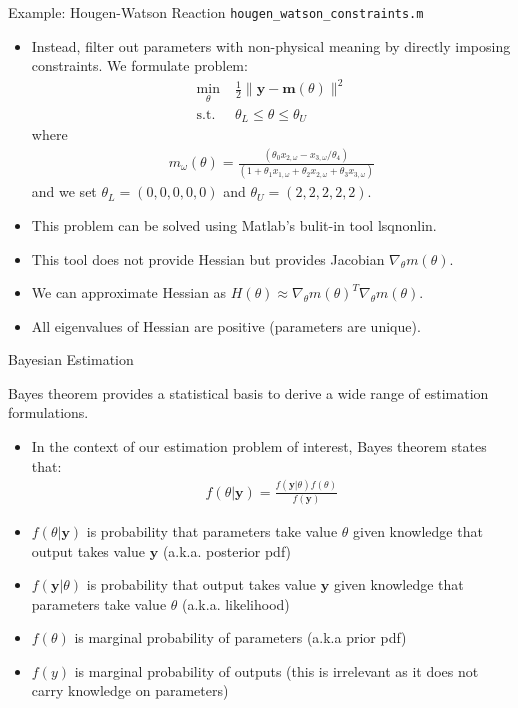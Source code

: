 \documentclass[handout,9pt]{beamer}
\begin{document}
%
\begin{frame}{Example: Hougen-Watson Reaction \footnotesize{\texttt{hougen\_watson\_constraints.m}}}

\begin{itemize}
\setlength{\itemsep}{10pt}
\item Instead, filter out parameters with non-physical meaning by directly imposing constraints. We formulate problem:
\begin{align*}
\min_{\theta}& \; \frac{1}{2}\|\mathbf{y}- \mathbf{m}(\theta)\|^2\\ 
\textrm{s.t.}&\; \theta_L\leq \theta\leq\theta_U 
\end{align*}
where
\begin{align*}
m_\omega(\theta)=\frac{(\theta_0x_{2,\omega}-x_{3,\omega}/\theta_4)}{(1+\theta_1x_{1,\omega}+\theta_2x_{2,\omega}+\theta_3x_{3,\omega})}
\end{align*}
and we set $\theta_L=(0,0,0,0,0)$ and $\theta_U=(2,2,2,2,2)$. 
\item This problem can be solved using Matlab's bulit-in tool \textrm{lsqnonlin}. 
\item This tool does not provide Hessian but provides Jacobian $\nabla_\theta m(\theta)$. 
\item We can approximate Hessian as $H(\theta)\approx \nabla_\theta m(\theta)^T\nabla_\theta m(\theta)$.
\item All eigenvalues of Hessian are positive (parameters are unique).
\end{itemize}
\end{frame}

%
\begin{frame}{Bayesian Estimation}

Bayes theorem provides a statistical basis to derive a wide range of estimation formulations. 

\begin{itemize}
\setlength{\itemsep}{10pt}
\item In the context of our estimation problem of interest, Bayes theorem states that:
\begin{align*}
f(\theta|\mathbf{y})=\frac{f(\mathbf{y}|\theta)f(\theta)}{f(\mathbf{y})}
\end{align*}
\item $f(\theta|\mathbf{y})$ is probability that parameters take value $\theta$ given knowledge that output takes value $\mathbf{y}$ (a.k.a. posterior pdf)
\item $f(\mathbf{y}|\theta)$ is probability that output takes value $\mathbf{y}$ given knowledge that parameters take value $\theta$ (a.k.a. likelihood)
\item $f(\theta)$ is marginal probability of parameters (a.k.a prior pdf)
\item $f(y)$ is marginal probability of outputs (this is irrelevant as it does not carry knowledge on parameters)
\end{itemize}


\end{frame}
\end{document}
